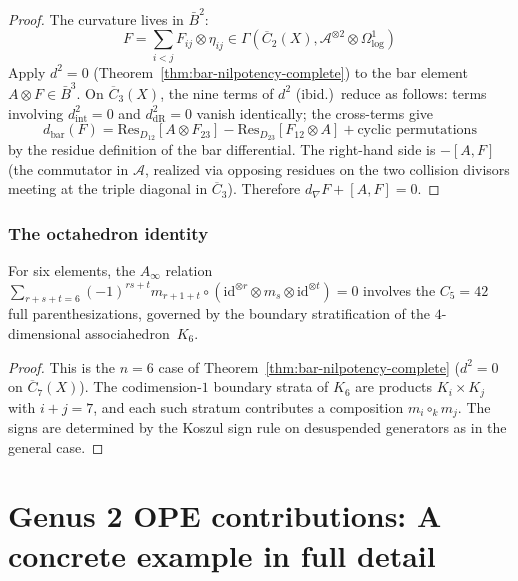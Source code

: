 \begin{proof}
The curvature lives in $\bar{B}^2$:
\[F = \sum_{i<j} F_{ij} \otimes \eta_{ij} \in \Gamma(\overline{C}_2(X), \mathcal{A}^{\otimes 2} \otimes \Omega^1_{\text{log}})\]
Apply $d^2 = 0$ (Theorem~\ref{thm:bar-nilpotency-complete}) to the bar element $A \otimes F \in \bar{B}^3$. On $\overline{C}_3(X)$, the nine terms of $d^2$ (ibid.)\ reduce as follows: terms involving $d_{\mathrm{int}}^2 = 0$ and $d_{\mathrm{dR}}^2 = 0$ vanish identically; the cross-terms give
\[d_{\mathrm{bar}}(F) = \mathrm{Res}_{D_{12}}[A \otimes F_{23}] - \mathrm{Res}_{D_{23}}[F_{12} \otimes A] + \text{cyclic permutations}\]
by the residue definition of the bar differential. The right-hand side is $-[A, F]$ (the commutator in $\mathcal{A}$, realized via opposing residues on the two collision divisors meeting at the triple diagonal in $\overline{C}_3$). Therefore $d_\nabla F + [A,F] = 0$.
\end{proof}

\subsubsection{The octahedron identity}

\begin{corollary}\label{cor:higher-associahedron-m6}
For six elements, the $A_\infty$ relation $\sum_{r+s+t=6}(-1)^{rs+t}m_{r+1+t}\circ(\mathrm{id}^{\otimes r}\otimes m_s\otimes\mathrm{id}^{\otimes t})=0$ involves the $C_5 = 42$ full parenthesizations, governed by the boundary stratification of the $4$-dimensional associahedron~$K_6$.
\end{corollary}

\begin{proof}
This is the $n=6$ case of Theorem~\ref{thm:bar-nilpotency-complete} ($d^2=0$ on $\overline{C}_7(X)$). The codimension-$1$ boundary strata of $K_6$ are products $K_i \times K_j$ with $i+j=7$, and each such stratum contributes a composition $m_i \circ_k m_j$. The signs are determined by the Koszul sign rule on desuspended generators as in the general case.
\end{proof}

\section{Genus 2 OPE contributions: A concrete example in full detail}
\label{sec:genus_2_ope_example}

